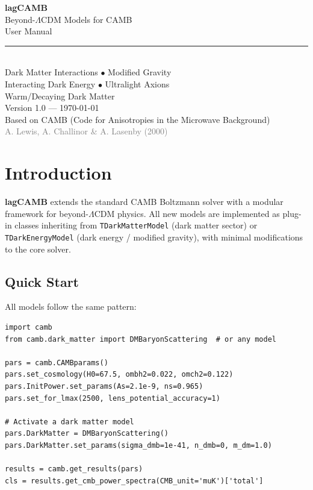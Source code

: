 \documentclass[11pt,a4paper]{article}
\begin{document}
\begin{titlepage}
\centering
\vspace*{3cm}
{\Huge\bfseries\color{accentdark} lagCAMB\\[0.3em]}
{\LARGE\color{accent} Beyond-$\Lambda$CDM Models for CAMB}\\[2cm]
{\Large User Manual}\\[1cm]
\textcolor{gray}{\rule{0.6\textwidth}{0.5pt}}\\[1cm]
{\large
Dark Matter Interactions $\bullet$ Modified Gravity\\[0.3em]
Interacting Dark Energy $\bullet$ Ultralight Axions\\[0.3em]
Warm/Decaying Dark Matter}\\[2cm]
{\normalsize Version 1.0 --- \today}\\[0.5cm]
{\normalsize Based on CAMB (Code for Anisotropies in the Microwave Background)}\\[0.3cm]
{\small\textcolor{gray}{A. Lewis, A. Challinor \& A. Lasenby (2000)}}
\vfill
\end{titlepage}

\tableofcontents
\newpage

\section{Introduction}

\textbf{lagCAMB} extends the standard CAMB Boltzmann solver with a modular framework for beyond-$\Lambda$CDM physics. All new models are implemented as plug-in classes inheriting from \texttt{TDarkMatterModel} (dark matter sector) or \texttt{TDarkEnergyModel} (dark energy / modified gravity), with minimal modifications to the core solver.

\subsection{Quick Start}

All models follow the same pattern:

\begin{lstlisting}
import camb
from camb.dark_matter import DMBaryonScattering  # or any model

pars = camb.CAMBparams()
pars.set_cosmology(H0=67.5, ombh2=0.022, omch2=0.122)
pars.InitPower.set_params(As=2.1e-9, ns=0.965)
pars.set_for_lmax(2500, lens_potential_accuracy=1)

# Activate a dark matter model
pars.DarkMatter = DMBaryonScattering()
pars.DarkMatter.set_params(sigma_dmb=1e-41, n_dmb=0, m_dm=1.0)

results = camb.get_results(pars)
cls = results.get_cmb_power_spectra(CMB_unit='muK')['total']
\end{lstlisting}
\end{document}
